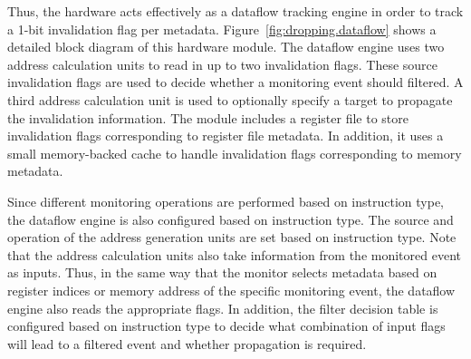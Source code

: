 Thus, the hardware acts effectively as a dataflow tracking engine in order to
track a 1-bit invalidation flag per metadata. Figure~\ref{fig:dropping.dataflow} shows a detailed block
diagram of this hardware module. The dataflow engine uses two address
calculation units to read in up to two invalidation flags. These source invalidation flags
are used to decide whether a monitoring event should filtered. A third address
calculation unit is used to optionally specify a target to propagate the
invalidation information. The module includes a register file to store invalidation
flags corresponding to register file metadata. In addition, it uses a small
memory-backed cache to handle invalidation flags corresponding to memory metadata.

Since different monitoring operations are performed based on instruction type,
the dataflow engine is also configured based on instruction type. The source
and operation of the address generation units are set based on instruction
type. Note that the address calculation units also take information from the
monitored event as inputs. Thus, in the same way that the monitor selects
metadata based on register indices or memory address of the specific monitoring
event, the dataflow engine also reads the appropriate flags. In addition, the
filter decision table is configured based on instruction type to decide what
combination of input flags will lead to a filtered event and whether
propagation is required.



